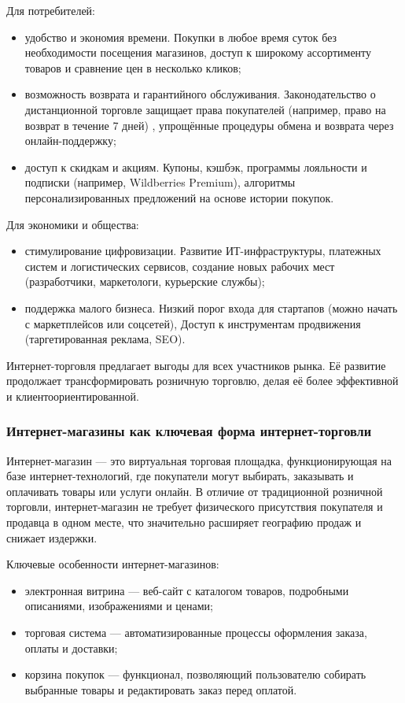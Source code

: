 Для потребителей:
 \begin{itemize}
 	\item удобство и экономия времени. Покупки в любое время суток без необходимости посещения магазинов, доступ к широкому ассортименту товаров и сравнение цен в несколько кликов;
 	\item возможность возврата и гарантийного обслуживания. Законодательство о дистанционной торговле защищает права покупателей (например, право на возврат в течение 7 дней) \cite{3}, упрощённые процедуры обмена и возврата через онлайн-поддержку;
 	\item доступ к скидкам и акциям. Купоны, кэшбэк, программы лояльности и подписки (например, Wildberries Premium), алгоритмы персонализированных предложений на основе истории покупок.
 \end{itemize}
 
 Для экономики и общества:
 \begin{itemize}
 	\item стимулирование цифровизации. Развитие ИТ-инфраструктуры, платежных систем и логистических сервисов, создание новых рабочих мест (разработчики, маркетологи, курьерские службы);
 	\item поддержка малого бизнеса. Низкий порог входа для стартапов (можно начать с маркетплейсов или соцсетей), Доступ к инструментам продвижения (таргетированная реклама, SEO).
 \end{itemize}
 
 Интернет-торговля предлагает выгоды для всех участников рынка. Её развитие продолжает трансформировать розничную торговлю, делая её более эффективной и клиентоориентированной.
 
\subsubsection{Интернет-магазины как ключевая форма интернет-торговли}

Интернет-магазин — это виртуальная торговая площадка, функционирующая на базе интернет-технологий, где покупатели могут выбирать, заказывать и оплачивать товары или услуги онлайн. В отличие от традиционной розничной торговли, интернет-магазин не требует физического присутствия покупателя и продавца в одном месте, что значительно расширяет географию продаж и снижает издержки.

Ключевые особенности интернет-магазинов:
 \begin{itemize}
 	\item электронная витрина — веб-сайт с каталогом товаров, подробными описаниями, изображениями и ценами;
 	\item торговая система — автоматизированные процессы оформления заказа, оплаты и доставки;
 	\item корзина покупок — функционал, позволяющий пользователю собирать выбранные товары и редактировать заказ перед оплатой.
 \end{itemize}
 
